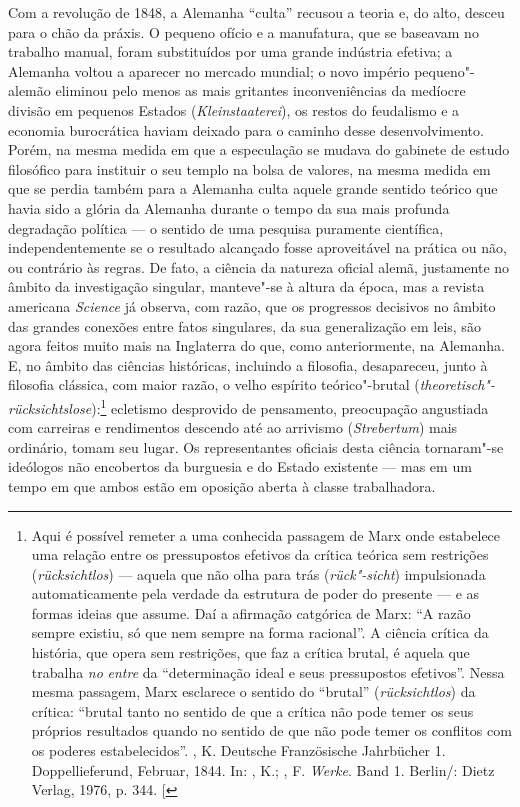 Com a revolução de 1848, a Alemanha ``culta'' recusou a teoria e, do
alto, desceu para o chão da práxis. O pequeno ofício e a manufatura, que
se baseavam no trabalho manual, foram substituídos por uma grande
indústria efetiva; a Alemanha voltou a aparecer no mercado mundial; o
novo império pequeno"-alemão eliminou pelo
menos as mais gritantes inconveniências da medíocre divisão em pequenos
Estados (\emph{Kleinstaaterei}), os restos
do feudalismo e a economia burocrática haviam deixado para o caminho
desse desenvolvimento. Porém, na mesma medida em que a especulação se
mudava do gabinete de estudo filosófico para instituir o seu templo na
bolsa de valores, na mesma medida em que se perdia também para a
Alemanha culta aquele grande sentido teórico que havia sido a glória da
Alemanha durante o tempo da sua mais profunda degradação política --- o
sentido de uma pesquisa puramente científica, independentemente se o
resultado alcançado fosse aproveitável na prática ou não, ou contrário
às regras. De fato, a ciência da natureza oficial alemã, justamente no
âmbito da investigação singular, manteve"-se à altura da época, mas a
revista americana \emph{Science } já observa, com razão, que os
progressos decisivos no âmbito das grandes conexões entre fatos
singulares, da sua generalização em leis, são agora feitos muito mais na
Inglaterra do que, como anteriormente, na Alemanha. E, no âmbito das
ciências históricas, incluindo a filosofia, desapareceu, junto à
filosofia clássica, com maior razão, o velho espírito teórico"-brutal
(\emph{theoretisch"-rücksichtslose}):\footnote{Aqui é
  possível remeter a uma conhecida passagem de Marx onde estabelece uma
  relação entre os pressupostos efetivos da crítica teórica sem
  restrições (\emph{rücksichtlos}) --- aquela que não olha para trás
  (\emph{rück"-sicht}) impulsionada automaticamente pela verdade da
  estrutura de poder do presente --- e as formas ideias que assume. Daí a
  afirmação catgórica de Marx: ``A razão sempre existiu, só que nem
  sempre na forma racional''. A ciência crítica da história, que opera
  sem restrições, que faz a crítica brutal, é aquela que trabalha
  \emph{no} \emph{entre} da ``determinação ideal e seus pressupostos
  efetivos''. Nessa mesma passagem, Marx esclarece o sentido do
  ``brutal'' (\emph{rücksichtlos}) da crítica: ``brutal tanto no sentido
  de que a crítica não pode temer os seus próprios resultados quando no
  sentido de que não pode temer os conflitos com os poderes
  estabelecidos''. , K. Deutsche Französische Jahrbücher 1.
  Doppellieferund, Februar, 1844. In: , K.; , F. \emph{Werke}.
  Band 1. Berlin/: Dietz Verlag, 1976, p. 344. {[}\versal{N.\,T.}{]}} ecletismo desprovido
de pensamento, preocupação angustiada com carreiras e rendimentos
descendo até ao arrivismo (\emph{Strebertum}) mais ordinário, tomam seu
lugar. Os representantes oficiais desta ciência tornaram"-se ideólogos
não encobertos da burguesia e do Estado existente --- mas em um tempo em
que ambos estão em oposição aberta à classe trabalhadora.

